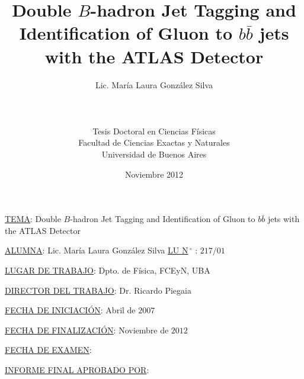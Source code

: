 \documentclass[11pt,a4paper,12pt]{report}
\title{Double $B$-hadron Jet Tagging and Identification of Gluon to $b \bar{b}$ jets with the ATLAS Detector}
\author{Lic. Mar\'ia Laura Gonz\'alez Silva \\ \\ \\ \\Tesis Doctoral en Ciencias F\'isicas\\Facultad de Ciencias Exactas y Naturales\\Universidad de Buenos Aires}
\date{Noviembre 2012}
\begin{document}
\maketitle


\newpage

\thispagestyle{empty}


{ \underline{TEMA}:} {\small Double $B$-hadron Jet Tagging and Identification of Gluon to $b \bar{b}$ jets with the ATLAS Detector}

\vspace{1cm}

{ \underline{ALUMNA}:} {\small Lic. Mar\'ia Laura Gonz\'alez Silva} \hspace{2cm} {\underline{ LU N$\,^{\circ}$} : {\small $217/01$} }

\vspace{1cm}

{ \underline{LUGAR DE TRABAJO}:} {\small Dpto. de F\'isica, FCEyN, UBA}

\vspace{1cm}

{ \underline{DIRECTOR DEL TRABAJO}:} {\small Dr. Ricardo Piegaia}


\vspace{1cm}

{ \underline{FECHA DE INICIACI\'{O}N}:} {\small Abril de $2007$}

\vspace{1cm}

{ \underline{FECHA DE FINALIZACI\'{O}N}:} {\small Noviembre de $2012$}

\vspace{1cm}

{ \underline{FECHA DE EXAMEN}:}

\vspace{1cm}

{ \underline{INFORME FINAL APROBADO POR}:}

\vspace{2.25cm}

\underline{       \hspace{6cm}              }        \hspace{2cm} \underline{         \hspace{6cm}               }
\end{document}
